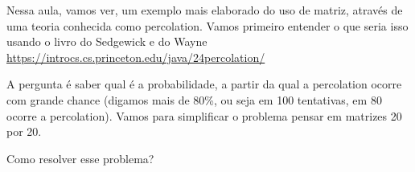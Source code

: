 \documentclass[a4paper]{article}
\begin{document}
Nessa aula, vamos ver, um exemplo mais elaborado do uso de matriz, através de uma teoria conhecida
como percolation. Vamos primeiro entender o que seria isso usando o livro do Sedgewick e do Wayne
\url{https://introcs.cs.princeton.edu/java/24percolation/}

A pergunta é saber qual é a probabilidade, a partir da qual a percolation ocorre com grande
chance (digamos mais de 80\%, ou seja em 100 tentativas, em 80 ocorre a percolation). Vamos para simplificar
o problema pensar em matrizes 20 por 20.

Como resolver esse problema?
\end{document}
